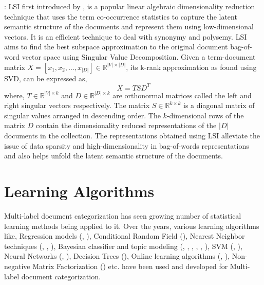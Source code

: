  : LSI first introduced by \cite{deerwester1990indexing}, is a popular linear algebraic dimensionality reduction technique that uses the term co-occurrence statistics to capture the latent semantic structure of the documents and represent them using low-dimensional vectors. It is an efficient technique to deal with synonymy and polysemy. LSI aims to find the best subspace approximation to the original document bag-of-word vector space using Singular Value Decomposition. Given a term-document matrix $X = \left[ x_{1}, x_{2}, \ldots, x_{|D|} \right] \in \mathbb{R}^{|V| \times |D|}$, its k-rank approximation as found using SVD, can be expressed as, 
\begin{equation}
X = T S D^{T}
\end{equation}
where, $T \in \mathbb{R}^{|V| \times k}$ and $D \in \mathbb{R}^{|D| \times k}$ are orthonormal matrices called the left and right singular vectors respectively. The matrix $S \in \mathbb{R}^{k \times k}$ is a diagonal matrix of singular values arranged in descending order. The $k$-dimensional rows of the matrix $D$ contain the dimensionality reduced representations of the $|D|$ documents in the collection. The representations obtained using LSI alleviate the issue of data sparsity and high-dimensionality in bag-of-words representations and also helps unfold the latent semantic structure of the documents.

\section{Learning Algorithms}
\label{sec:lalgos}
Multi-label document categorization has seen growing number of statistical learning methods being applied to it. Over the years, various learning algorithms like, Regression models (\citep{cooper1994full}, \citep{fuhr1991air}), Conditional Random Field (\citep{ghamrawi2005collective}), Nearest Neighbor techniques (\citep{yang1994expert}, \citep{zhang2005k}, \citep{zhang2007ml}), Bayesian classifier and topic modeling (\citep{lewis1994comparison}, \citep{mccallum1999multi}, \citep{nigam2000text}, \citep{rubin2012statistical}, \citep{nigam1999using}, \citep{ueda2002parametric}), SVM (\citep{joachims1998text}, \citep{elisseeff2001kernel}), Neural Networks (\citep{wiener1995neural}, \citep{ng1997feature}), Decision Trees (\citep{tong1994machine}), Online learning algorithms (\citep{lewis1996training}, \citep{crammer2002new}), Non-negative Matrix Factorization (\citep{liu2006semi}) etc. have been used and developed for Multi-label document categorization.

